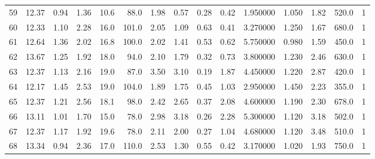 \documentclass{article}
\begin{document}
\begin{tabular}{lrrrrrrrrrrrrrr}
    59  &    12.37 &        0.94 &  1.36 &               10.6 &       88.0 &           1.98 &        0.57 &                  0.28 &             0.42 &         1.950000 &  1.050 &                          1.82 &    520.0 &      1 \\
    60  &    12.33 &        1.10 &  2.28 &               16.0 &      101.0 &           2.05 &        1.09 &                  0.63 &             0.41 &         3.270000 &  1.250 &                          1.67 &    680.0 &      1 \\
    61  &    12.64 &        1.36 &  2.02 &               16.8 &      100.0 &           2.02 &        1.41 &                  0.53 &             0.62 &         5.750000 &  0.980 &                          1.59 &    450.0 &      1 \\
    62  &    13.67 &        1.25 &  1.92 &               18.0 &       94.0 &           2.10 &        1.79 &                  0.32 &             0.73 &         3.800000 &  1.230 &                          2.46 &    630.0 &      1 \\
    63  &    12.37 &        1.13 &  2.16 &               19.0 &       87.0 &           3.50 &        3.10 &                  0.19 &             1.87 &         4.450000 &  1.220 &                          2.87 &    420.0 &      1 \\
    64  &    12.17 &        1.45 &  2.53 &               19.0 &      104.0 &           1.89 &        1.75 &                  0.45 &             1.03 &         2.950000 &  1.450 &                          2.23 &    355.0 &      1 \\
    65  &    12.37 &        1.21 &  2.56 &               18.1 &       98.0 &           2.42 &        2.65 &                  0.37 &             2.08 &         4.600000 &  1.190 &                          2.30 &    678.0 &      1 \\
    66  &    13.11 &        1.01 &  1.70 &               15.0 &       78.0 &           2.98 &        3.18 &                  0.26 &             2.28 &         5.300000 &  1.120 &                          3.18 &    502.0 &      1 \\
    67  &    12.37 &        1.17 &  1.92 &               19.6 &       78.0 &           2.11 &        2.00 &                  0.27 &             1.04 &         4.680000 &  1.120 &                          3.48 &    510.0 &      1 \\
    68  &    13.34 &        0.94 &  2.36 &               17.0 &      110.0 &           2.53 &        1.30 &                  0.55 &             0.42 &         3.170000 &  1.020 &                          1.93 &    750.0 &      1 \\

\end{tabular}
\end{document}
